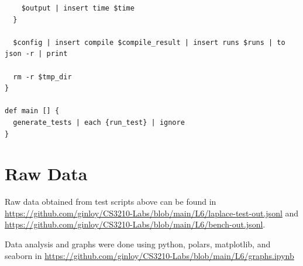 \documentclass{article}
\begin{document}
\begin{appendices}
\begin{verbatim}
    $output | insert time $time
  }

  $config | insert compile $compile_result | insert runs $runs | to json -r | print

  rm -r $tmp_dir
}

def main [] {
  generate_tests | each {run_test} | ignore
}
\end{verbatim}
\section{Raw Data}
Raw data obtained from test scripts above can be found in
\url{https://github.com/ginloy/CS3210-Labs/blob/main/L6/laplace-test-out.jsonl} and
\url{https://github.com/ginloy/CS3210-Labs/blob/main/L6/bench-out.jsonl}.

Data analysis and graphs were done using python, polars, matplotlib, and seaborn in
\url{https://github.com/ginloy/CS3210-Labs/blob/main/L6/graphs.ipynb}
\end{appendices}
\end{document}
